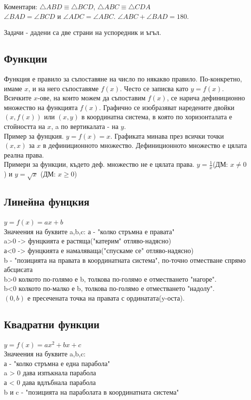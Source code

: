 \documentclass{article}
\begin{document}
Коментари: $\triangle ABD \equiv \triangle  BCD $, 
 $\triangle ABC \equiv \triangle CDA $ \\
 $\angle BAD = \angle BCD $ и $ \angle ADC = \angle ABC $. $\angle ABC + \angle BAD = 180$.


Задачи - дадени са две страни на успоредник и ъгъл.

\subsection{Функции}
Функция е правило за съпоставяне на число по някакво правило. По-конкретно, имаме $x$, и на него съпоставяме $f(x)$.
Често се записва като $ y = f(x) $. Всичките $x$-ове, на които можем да съпоставим $f(x)$, се нарича дефиниционно множество на функцията $f(x)$. Графично се изобразяват наредените двойки $(x, f(x)) $ или $(x,y)$ в координатна система, в която по хоризонталата е стойността на $x$, a по вертикалата - на $y$.\\
Пример за фунцкия. $y =f(x) = x$.
Графиката минава през всички точки $(x,x)$ за $x$ в дефиниционното множество. Дефиниционното множество е цялата реална права. \\
Примери за функции, където деф. множество не е цялата права.
$y = \frac{1}{x}$(ДМ: $x \neq 0 $) и $y = \sqrt x$ (ДМ: $x \geq 0$)

\subsection{Линейна фунцкия}
$ y = f(x) = ax + b$ \\
Значеения на буквите a,b,c:
а - "колко стръмна е правата" \\
a>0 -> фунцкията е растяща("катерим" отляво-надясно) \\
а<0 -> фунцкията е намаляваща("спускаме се" отляво-надясно) \\
b - "позицията на правата в координатната система", по-точно отместване спрямо абсцисата \\
b>0 колкото по-голямо е b, толкова по-голямо е отместването "нагоре".\\
b<0 колкото по-малко е b, толкова по-голямо е отместването "надолу". \\ 
$(0,b)$ е пресечената точка на правата с ординатата(y-оста). \\

\subsection{Квадратни функции}
$ y = f(x) = ax^2 + bx + c$ \\
Значеения на буквите a,b,c: \\
а - "колко стръмна е една парабола" \\
a > 0 дава изпъкнала парабола \\
а < 0 дава вдлъбнала парабола \\
b и c - "позицията на параболата в координатната система"
\end{document}
